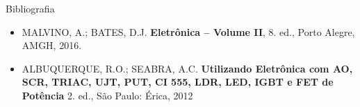\documentclass[aspectratio=169,
				xcolor=table]{beamer}
\begin{document}
	\begin{frame}{Bibliografia}
		\begin{itemize}
			\item MALVINO, A.; BATES, D.J. \textbf{Eletrônica – Volume II}, 8. ed., Porto Alegre, AMGH, 2016.
			\vspace{1em}
			\item ALBUQUERQUE, R.O.; SEABRA, A.C. \textbf{Utilizando Eletrônica com AO, SCR, TRIAC, UJT, PUT, CI 555, LDR, LED, IGBT e FET de Potência }  2. ed., São Paulo: Érica, 2012

		\end{itemize}
	\end{frame}	

	\begin{frame}{}
	\end{frame}
\end{document}
